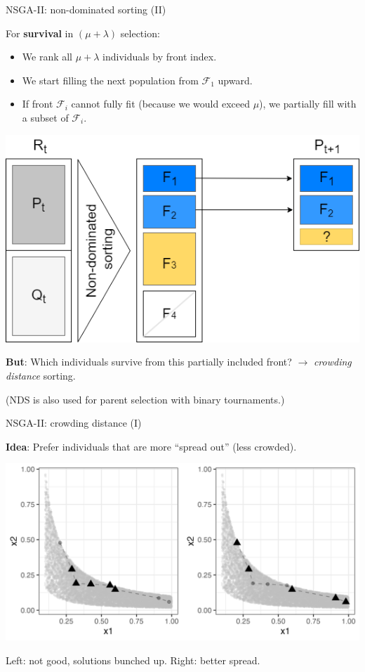\documentclass[11pt,compress,t,notes=noshow,xcolor=table]{beamer}
\begin{document}
\begin{vbframe}{NSGA-II: non-dominated sorting (II)}

For \textbf{survival} in $(\mu + \lambda)$ selection:
\begin{itemize}
\item We rank all $\mu + \lambda$ individuals by front index.
\item We start filling the next population from $\mathcal{F}_1$ upward.
\item If front $\mathcal{F}_i$ cannot fully fit (because we would exceed $\mu$), we partially fill with a subset of $\mathcal{F}_i$.
\end{itemize}

\begin{center}
\includegraphics[width=0.45\linewidth]{figure_man/NSGA2_2.png}
\end{center}

\textbf{But}: Which individuals survive from this partially included front?  
$\to$ \emph{crowding distance} sorting.

\smallskip
\footnotesize
(NDS is also used for parent selection with binary tournaments.)
\normalsize

\end{vbframe}

\begin{vbframe}{NSGA-II: crowding distance (I)}

\textbf{Idea}: Prefer individuals that are more “spread out” (less crowded).

\begin{center}
\includegraphics[height=0.55\textheight]{figure_man/NSGA2_CS1.png}
\end{center}

Left: not good, solutions bunched up.  
Right: better spread.

\end{vbframe}
\end{document}
